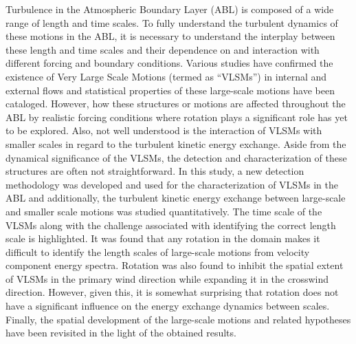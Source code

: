 
Turbulence in the Atmospheric Boundary Layer (ABL) is composed of a wide range of length
and time scales. To fully understand the turbulent dynamics of these motions in the ABL, it is
necessary to understand the interplay between these length and time scales and their
dependence on and interaction with different forcing and boundary conditions. Various studies
have confirmed the existence of Very Large Scale Motions (termed as “VLSMs”) in internal and
external flows and statistical properties of these large-scale motions have been cataloged.
However, how these structures or motions are affected throughout the ABL by realistic forcing
conditions where rotation plays a significant role has yet to be explored. Also, not well
understood is the interaction of VLSMs with smaller scales in regard to the turbulent kinetic
energy exchange. Aside from the dynamical significance of the VLSMs, the detection and
characterization of these structures are often not straightforward. In this study, a new detection
methodology was developed and used for the characterization of VLSMs in the ABL and
additionally, the turbulent kinetic energy exchange between large-scale and smaller scale
motions was studied quantitatively. The time scale of the VLSMs along with the challenge
associated with identifying the correct length scale is highlighted. It was found that any rotation
in the domain makes it difficult to identify the length scales of large-scale motions from velocity
component energy spectra. Rotation was also found to inhibit the spatial extent of VLSMs in the
primary wind direction while expanding it in the crosswind direction. However, given this, it is
somewhat surprising that rotation does not have a significant influence on the energy exchange
dynamics between scales. Finally, the spatial development of the large-scale motions and
related hypotheses have been revisited in the light of the obtained results.
